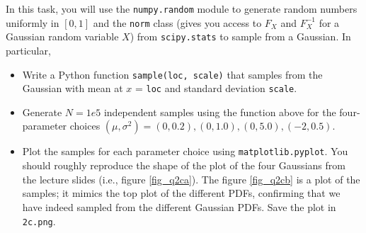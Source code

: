 \begin{tcolorbox}
    In this task, you will use the \texttt{numpy.random} module to generate random
    numbers uniformly in $[0, 1]$ and the \texttt{norm} class (gives you access to
    $F_X$ and $F_X^{-1}$ for a Gaussian random variable $X$) from
    \texttt{scipy.stats} to sample from a Gaussian. In particular,

    \vspace{10pt}
    \begin{itemize}
        \item Write a Python function \texttt{sample(loc, scale)} that samples
        from the Gaussian with mean at $x$ = \texttt{loc} and standard deviation
        \texttt{scale}.
        \item Generate $N = 1e5$ independent samples using the function above for
        the four-parameter choices $(\mu, \sigma^2) = (0, 0.2), (0, 1.0), (0,
        5.0), (-2, 0.5)$.
        \item Plot the samples for each parameter choice using
        \texttt{matplotlib.pyplot}. You should roughly reproduce the shape of the
        plot of the four Gaussians from the lecture slides (i.e., figure
        \ref{fig_q2ca}). The figure \ref{fig_q2cb} is a plot of the samples; it
        mimics the top plot of the different PDFs, confirming that we have indeed
        sampled from the different Gaussian PDFs. Save the plot in
        \texttt{2c.png}.
    \end{itemize}


\end{tcolorbox}
